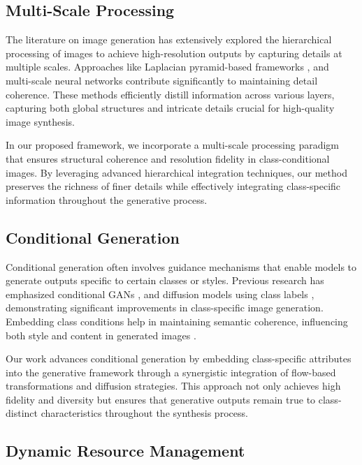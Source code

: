 \subsection{Multi-Scale Processing}

The literature on image generation has extensively explored the hierarchical processing of images to achieve high-resolution outputs by capturing details at multiple scales. Approaches like Laplacian pyramid-based frameworks \cite{denton2015deep}, and multi-scale neural networks \cite{wang2018recovering, ledig2017photo} contribute significantly to maintaining detail coherence. These methods efficiently distill information across various layers, capturing both global structures and intricate details crucial for high-quality image synthesis.

In our proposed framework, we incorporate a multi-scale processing paradigm that ensures structural coherence and resolution fidelity in class-conditional images. By leveraging advanced hierarchical integration techniques, our method preserves the richness of finer details while effectively integrating class-specific information throughout the generative process.

\subsection{Conditional Generation}

Conditional generation often involves guidance mechanisms that enable models to generate outputs specific to certain classes or styles. Previous research has emphasized conditional GANs \cite{mirza2014conditional}, and diffusion models using class labels \cite{dhariwal2021diffusion}, demonstrating significant improvements in class-specific image generation. Embedding class conditions help in maintaining semantic coherence, influencing both style and content in generated images \cite{karras2019style, park2019semantic}.

Our work advances conditional generation by embedding class-specific attributes into the generative framework through a synergistic integration of flow-based transformations and diffusion strategies. This approach not only achieves high fidelity and diversity but ensures that generative outputs remain true to class-distinct characteristics throughout the synthesis process.

\subsection{Dynamic Resource Management}

